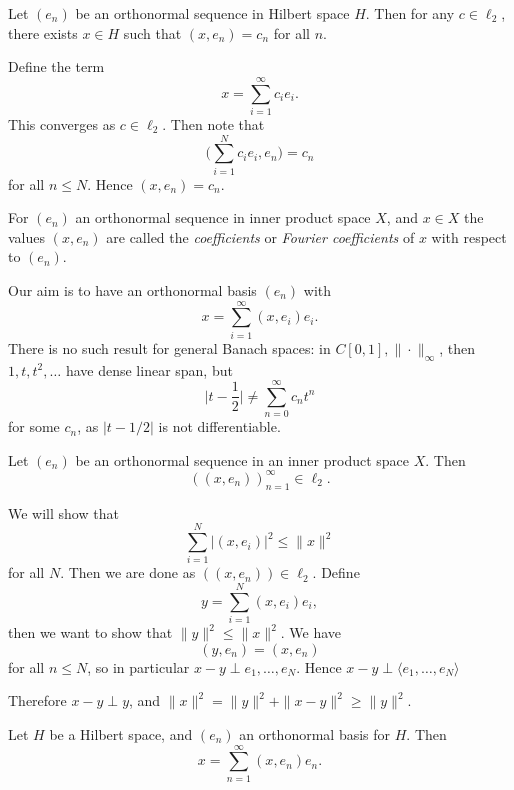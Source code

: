 \documentclass[12pt]{article}
\begin{document}
\begin{corollary}
	Let $(e_n)$ be an orthonormal sequence in Hilbert space $H$. Then for any $c \in \ell_2$, there exists $x \in H$ such that $(x, e_n) = c_n$ for all $n$.
\end{corollary}

\begin{proofbox}
	Define the term
	\[
	x = \sum_{i = 1}^{\infty} c_i e_i.
	\]
	This converges as $c \in \ell_2$. Then note that
	\[
	\Biggl( \sum_{i = 1}^{N} c_i e_i, e_n\Biggr) = c_n
	\]
	for all $n \leq N$. Hence $(x, e_n) = c_n$.
\end{proofbox}

For $(e_n)$ an orthonormal sequence in inner product space $X$, and $x \in X$ the values $(x, e_n)$ are called the \emph{coefficients} or \emph{Fourier coefficients} of $x$ with respect to $(e_n)$.

Our aim is to have an orthonormal basis $(e_n)$ with
\[
x = \sum_{i = 1}^{\infty}(x, e_i) e_i.
\]
There is no such result for general Banach spaces: in $C[0,1], \|\cdot\|_{\infty}$, then $1, t, t^2,\ldots$ have dense linear span, but
\[
\biggl| t - \frac{1}{2} \biggr| \neq \sum_{n = 0}^{\infty} c_n t^n
\]
for some $c_n$, as $|t - 1/2|$ is not differentiable.

\begin{theorem}
	Let $(e_n)$ be an orthonormal sequence in an inner product space $X$. Then
	\[
		((x, e_n))_{n = 1}^{\infty} \in \ell_2.
	\]
\end{theorem}

\begin{proofbox}
	We will show that
	\[
	\sum_{i = 1}^{N} |(x, e_i)|^2 \leq \|x\|^2
	\]
	for all $N$. Then we are done as $((x, e_n)) \in \ell_2$. Define
	\[
	y = \sum_{i = 1}^{N}(x, e_i)e_i,
	\]
	then we want to show that $\|y\|^2 \leq \|x\|^2$. We have
	\[
		(y, e_n) = (x, e_n)
	\]
	for all $n \leq N$, so in particular $x - y \perp e_1, \ldots, e_N$. Hence $x - y \perp \langle e_1, \ldots, e_N \rangle$ 

	Therefore $x - y \perp y$, and $\|x\|^2 = \|y\|^2 + \|x-y\|^2 \geq \|y\|^2$.
\end{proofbox}


\begin{theorem}
	Let $H$ be a Hilbert space, and $(e_n)$ an orthonormal basis for $H$. Then
	\[
	x = \sum_{n = 1}^{\infty} (x, e_n) e_n.
	\]
\end{theorem}
\end{document}
